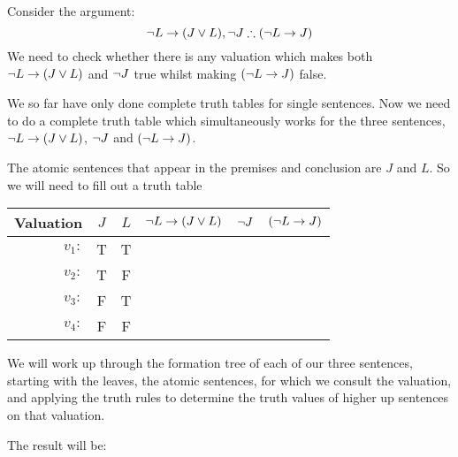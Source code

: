 Consider the argument:
$$\enot L \eif (J \eor L),\enot J\therefore (\enot L\eif J)$$
We need to check whether there is any valuation which makes both $\neg L \rightarrow (J \vee L)$ and $\neg J$ true whilst making $(\neg L\rightarrow J) $ false. 

We so far have only done complete truth tables for single sentences. Now we need to do a complete truth table which simultaneously works for the three sentences, $\neg L \rightarrow (J \vee L)$, $\neg J$ and $(\neg L\rightarrow J)$.


The atomic sentences that appear in the premises and conclusion are $J$ and $L$. So we will need to fill out a truth table

\begin{center}
	\begin{tabular}{rcc|c|c|c}
		Valuation&$J$&$L$&$\neg L \rightarrow (J \vee L)$&$\neg J$ & $(\neg L\rightarrow J)$\\\hline
		$v_1:$&T&T&&&\\
		$v_2:$&T&F&&&\\
		$v_3:$&F&T&&&\\
		$v_4:$&F&F&&
	\end{tabular}
\end{center}

We will work up through the formation tree of each of our three sentences, starting with the leaves, the atomic sentences, for which we consult the valuation, and applying the truth rules to determine the truth values of higher up sentences on that valuation. 

The result will be:

